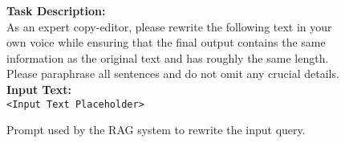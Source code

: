 


\begin{figure*}[ht!]
    \centering
    \begin{tcolorbox}[
        enhanced,                  %
        colframe=blue!70!black,    %
        colback=blue!5,            %
        coltitle=white,            %
        colbacktitle=blue!70!black, %
        width=\textwidth,          %
        arc=4mm,                   %
        boxrule=1mm,               %
        drop shadow,               %
        title=Copy-Editing Task Description, %
        fonttitle=\bfseries\large  %
    ]

    \textbf{Task Description:}\\%

    As an expert copy-editor, please rewrite the following text in your own voice while ensuring that the final output contains the same information as the original text and has roughly the same length. Please paraphrase all sentences and do not omit any crucial details.\\[1em]

    \textbf{Input Text:}\\[1em]
    \texttt{<Input Text Placeholder>}

    \end{tcolorbox}
    \caption{Prompt used by the RAG system to rewrite the input query.}
    \label{fig:copy_editing_task}
\end{figure*}
